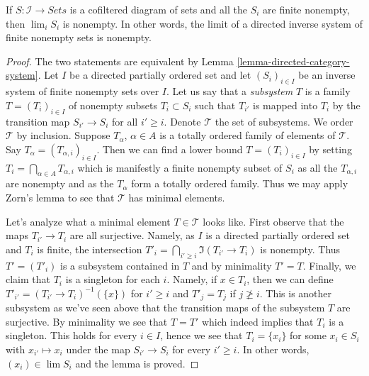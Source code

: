 \begin{lemma}
\label{lemma-nonempty-limit}
If $S : \mathcal{I} \to \textit{Sets}$ is a cofiltered diagram of sets
and all the $S_i$ are finite nonempty, then $\lim_i S_i$ is nonempty.
In other words, the limit of a directed inverse system of finite nonempty sets
is nonempty.
\end{lemma}

\begin{proof}
The two statements are equivalent by
Lemma \ref{lemma-directed-category-system}.
Let $I$ be a directed partially ordered set and let $(S_i)_{i \in I}$
be an inverse system of finite nonempty sets over $I$.
Let us say that a {\it subsystem} $T$ is a family $T = (T_i)_{i \in I}$
of nonempty subsets $T_i \subset S_i$ such that $T_{i'}$ is mapped
into $T_i$ by the transition map $S_{i'} \to S_i$ for all $i' \geq i$.
Denote $\mathcal{T}$ the set of subsystems. We order $\mathcal{T}$
by inclusion. Suppose $T_\alpha$, $\alpha \in A$ is a totally ordered family
of elements of $\mathcal{T}$. Say $T_\alpha = (T_{\alpha, i})_{i \in I}$.
Then we can find a lower bound $T = (T_i)_{i \in I}$ by setting
$T_i = \bigcap_{\alpha \in A} T_{\alpha, i}$ which is manifestly a
finite nonempty subset of $S_i$ as all the $T_{\alpha, i}$ are nonempty
and as the $T_\alpha$ form a totally ordered family. Thus we may
apply Zorn's lemma to see that $\mathcal{T}$ has minimal elements.

\medskip\noindent
Let's analyze what a minimal element $T \in \mathcal{T}$ looks like.
First observe that the maps $T_{i'} \to T_i$ are all surjective.
Namely, as $I$ is a directed partially ordered set and $T_i$ is finite,
the intersection $T'_i = \bigcap_{i' \geq i} \Im(T_{i'} \to T_i)$
is nonempty. Thus $T' = (T'_i)$ is a subsystem contained in $T$ and
by minimality $T' = T$. Finally, we claim that $T_i$ is a singleton
for each $i$. Namely, if $x \in T_i$, then we can define
$T'_{i'} = (T_{i'} \to T_i)^{-1}(\{x\})$ for $i' \geq i$ and
$T'_j = T_j$ if $j \not \geq i$. This is another subsystem as we've seen
above that the transition maps of the subsystem $T$ are surjective.
By minimality we see that $T = T'$ which indeed implies that $T_i$
is a singleton. This holds for every $i \in I$, hence we see that
$T_i = \{x_i\}$ for some $x_i \in S_i$ with $x_{i'} \mapsto x_i$
under the map $S_{i'} \to S_i$ for every $i' \geq i$. In other words,
$(x_i) \in \lim S_i$ and the lemma is proved.
\end{proof}






